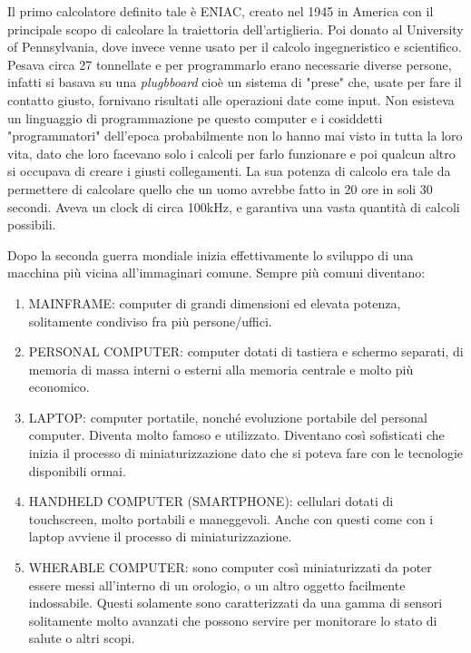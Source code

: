 \documentclass[
]{article}
\begin{document}
Il primo calcolatore definito tale è ENIAC, creato nel 1945 in America
con il principale scopo di calcolare la traiettoria dell'artiglieria.
Poi donato al University of Pennsylvania, dove invece venne usato per il
calcolo ingegneristico e scientifico. Pesava circa 27 tonnellate e per
programmarlo erano necessarie diverse persone, infatti si basava su una
\emph{plugbboard} cioè un sistema di "prese" che, usate per fare il
contatto giusto, fornivano risultati alle operazioni date come input.
Non esisteva un linguaggio di programmazione pe questo computer e i
cosiddetti "programmatori" dell'epoca probabilmente non lo hanno mai
visto in tutta la loro vita, dato che loro facevano solo i calcoli per
farlo funzionare e poi qualcun altro si occupava di creare i giusti
collegamenti. La sua potenza di calcolo era tale da permettere di
calcolare quello che un uomo avrebbe fatto in 20 ore in soli 30 secondi.
Aveva un clock di circa 100kHz, e garantiva una vasta quantità di
calcoli possibili.

Dopo la seconda guerra mondiale inizia effettivamente lo sviluppo di una
macchina più vicina all'immaginari comune. Sempre più comuni diventano:

\begin{enumerate}
\def\labelenumi{\arabic{enumi}.}
\item
  MAINFRAME: computer di grandi dimensioni ed elevata potenza,
  solitamente condiviso fra più persone/uffici.
\item
  PERSONAL COMPUTER: computer dotati di tastiera e schermo separati, di
  memoria di massa interni o esterni alla memoria centrale e molto più
  economico.
\item
  LAPTOP: computer portatile, nonché evoluzione portabile del personal
  computer. Diventa molto famoso e utilizzato. Diventano così
  sofisticati che inizia il processo di miniaturizzazione dato che si
  poteva fare con le tecnologie disponibili ormai.
\item
  HANDHELD COMPUTER (SMARTPHONE): cellulari dotati di touchscreen, molto
  portabili e maneggevoli. Anche con questi come con i laptop avviene il
  processo di miniaturizzazione.
\item
  WHERABLE COMPUTER: sono computer così miniaturizzati da poter essere
  messi all'interno di un orologio, o un altro oggetto facilmente
  indossabile. Questi solamente sono caratterizzati da una gamma di
  sensori solitamente molto avanzati che possono servire per monitorare
  lo stato di salute o altri scopi.
\end{enumerate}
\end{document}
